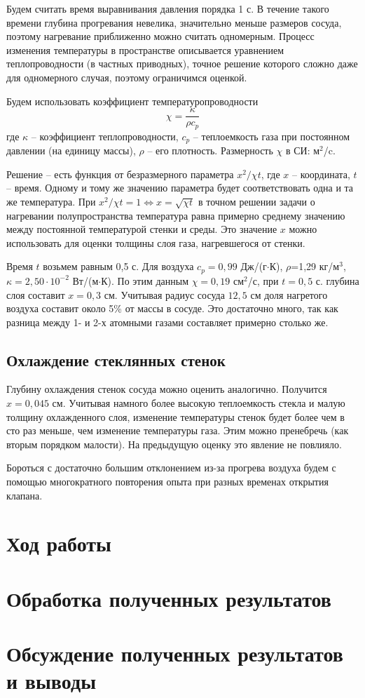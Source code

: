 \documentclass[a4paper,12pt]{article}
\begin{document}
    Будем считать время выравнивания давления порядка 1 с. В течение такого времени глубина прогревания невелика, значительно меньше размеров сосуда, поэтому нагревание приближенно можно считать одномерным. Процесс изменения температуры в пространстве описывается уравнением теплопроводности (в частных приводных), точное решение которого сложно даже для одномерного случая, поэтому ограничимся оценкой.

    Будем использовать коэффициент температуропроводности
    \begin{equation*}
        \chi=\frac{\kappa}{\rho c_p}
    \end{equation*}
    где $\kappa$ -- коэффициент теплопроводности, $c_p$ -- теплоемкость газа при постоянном давлении (на единицу массы), $\rho$ -- его плотность. Размерность $\chi$ в СИ: м$^2$/c.

    Решение -- есть функция от безразмерного параметра $x^2/\chi t$, где $x$ -- координата, $t$ -- время. Одному и тому же значению параметра будет соответствовать одна и та же температура. При $x^2/\chi t=1 \Leftrightarrow x=\sqrt{\chi t}$ в точном решении задачи о нагревании полупространства температура равна примерно среднему значению между постоянной температурой стенки и среды. Это значение $x$ можно использовать для оценки толщины слоя газа, нагревшегося от стенки.
    
    Время $t$ возьмем равным 0,5 с. Для воздуха $c_p=0,99$ Дж/(г$\cdot$К), $\rho$=1,29 кг/м$^3$, $\kappa=2,50\cdot10^{-2}$ Вт/(м$\cdot$К). По этим данным $\chi=0,19$ см$^2$/с, при $t=0,5$ с. глубина слоя составит $x=0,3$ см. Учитывая радиус сосуда $12,5$ см доля нагретого воздуха составит около 5\% от массы в сосуде. Это достаточно много, так как разница между 1- и 2-х атомными газами составляет примерно столько же.

    \subsection*{Охлаждение стеклянных стенок}
    Глубину охлаждения стенок сосуда можно оценить аналогично. Получится $x=0,045$ см. Учитывая намного более высокую теплоемкость стекла и малую толщину охлажденного слоя, изменение температуры стенок будет более чем в сто раз меньше, чем изменение температуры газа. Этим можно пренебречь (как вторым порядком малости). На предыдущую оценку это явление не повлияло.

    Бороться с достаточно большим отклонением из-за прогрева воздуха будем с помощью многократного повторения опыта при разных временах открытия клапана.

    \section*{Ход работы}

    \section*{Обработка полученных результатов}

    \section*{Обсуждение полученных результатов и выводы}

    
\end{document}
